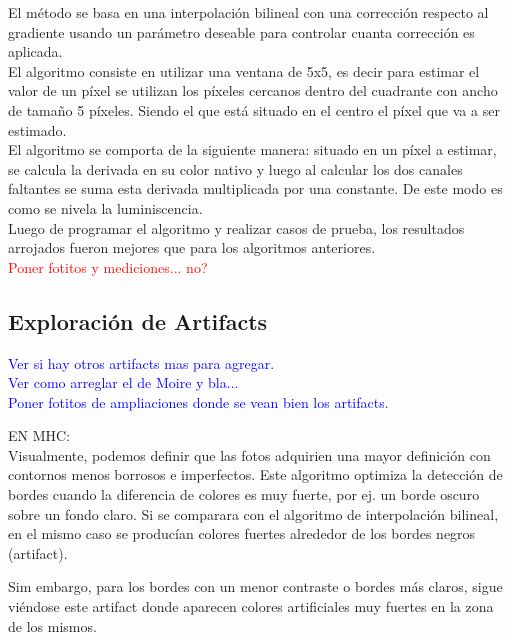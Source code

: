 \documentclass[a4paper]{article}
\begin{document}
El m\'etodo se basa en una interpolaci\'on bilineal con una correcci\'on respecto al gradiente usando un par\'ametro deseable para controlar cuanta correcci\'on es aplicada.\\

El algoritmo consiste en utilizar una ventana de 5x5, es decir para estimar el valor de un p\'ixel se utilizan los p\'ixeles cercanos dentro del cuadrante con ancho de tama\~no 5 p\'ixeles. Siendo el que est\'a situado en el centro el p\'ixel que va a ser estimado.\\

El algoritmo se comporta de la siguiente manera: situado en un p\'ixel a estimar, se calcula la derivada en su color nativo y luego al calcular los dos canales faltantes se suma esta derivada multiplicada por una constante. De este modo es como se nivela la luminiscencia.\\

Luego de programar el algoritmo y realizar casos de prueba, los resultados arrojados fueron mejores que para los algoritmos anteriores.\\

\textcolor{red}{Poner fotitos y mediciones... no?}\\


\newpage
\subsection{Exploraci\'on de Artifacts}

\textcolor{blue}{Ver si hay otros artifacts mas para agregar.\\
Ver como arreglar el de Moire y bla...\\
Poner fotitos de ampliaciones donde se vean bien los artifacts.}

EN MHC:\\

Visualmente, podemos definir que las fotos adquirien una mayor definici\'on con contornos menos borrosos e imperfectos. Este algoritmo optimiza la detecci\'on de bordes cuando la diferencia de colores es muy fuerte, por ej. un borde oscuro sobre un fondo claro. Si se comparara con el algoritmo de interpolaci\'on bilineal, en el mismo caso se produc\'ian colores fuertes alrededor de los bordes negros (artifact).

Sim embargo, para los bordes con un menor contraste o bordes m\'as claros, sigue vi\'endose este artifact donde aparecen colores artificiales muy fuertes en la zona de los mismos.
\end{document}
